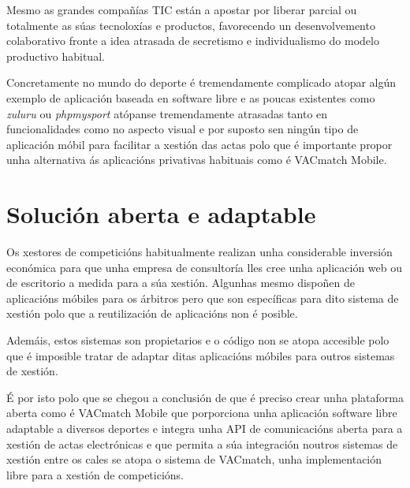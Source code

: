     Mesmo as grandes compañías TIC están a apostar por liberar parcial ou totalmente as 
súas tecnoloxías e productos, favorecendo un desenvolvemento colaborativo fronte a idea 
atrasada de secretismo e individualismo do modelo productivo habitual.

    Concretamente no mundo do deporte é tremendamente complicado atopar algún 
exemplo de aplicación baseada en software libre e as poucas existentes como 
\emph{zuluru} ou \emph{phpmysport} atópanse tremendamente atrasadas tanto en 
funcionalidades como no aspecto visual e por suposto sen ningún tipo de aplicación móbil 
para facilitar a xestión das actas polo que é importante propor unha alternativa 
ás aplicacións privativas habituais como é VACmatch Mobile.

  \section{Solución aberta e adaptable}
  Os xestores de competicións habitualmente realizan unha considerable inversión 
económica para que unha empresa de consultoría lles cree unha aplicación web ou de 
escritorio a medida para a súa xestión. Algunhas mesmo dispoñen de aplicacións móbiles 
para os árbitros pero que son específicas para dito sistema de xestión polo que a 
reutilización de aplicacións non é posible.

  Ademáis, estos sistemas son propietarios e o código non se atopa accesible 
polo que é imposible tratar de adaptar ditas aplicacións móbiles para outros 
sistemas de xestión.

  É por isto polo que se chegou a conclusión de que é preciso crear unha 
plataforma aberta como é VACmatch Mobile que porporciona unha aplicación 
software libre adaptable a diversos deportes e integra unha API de comunicacións 
aberta para a xestión de actas electrónicas e que permita a súa integración 
noutros sistemas de xestión entre os cales se atopa o sistema de VACmatch, unha 
implementación libre para a xestión de competicións.

  
